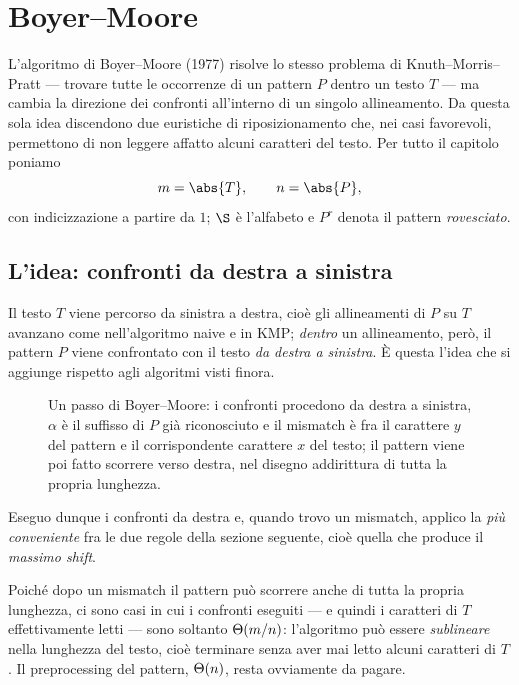 \chapter{Boyer--Moore}

L'algoritmo di Boyer--Moore (1977) risolve lo stesso problema di Knuth--Morris--Pratt
--- trovare tutte le occorrenze di un pattern $P$ dentro un testo $T$ --- ma cambia la
direzione dei confronti all'interno di un singolo allineamento. Da questa sola idea
discendono due euristiche di riposizionamento che, nei casi favorevoli, permettono di
non leggere affatto alcuni caratteri del testo. Per tutto il capitolo poniamo
\[
  m=\abs{T},\qquad n=\abs{P},
\]
con indicizzazione a partire da $1$; $\alfa$ è l'alfabeto e $P^r$ denota il pattern
\emph{rovesciato}.

\section{L'idea: confronti da destra a sinistra}

Il testo $T$ viene percorso da sinistra a destra, cioè gli allineamenti di $P$ su $T$
avanzano come nell'algoritmo naive e in KMP; \emph{dentro} un allineamento, però, il
pattern $P$ viene confrontato con il testo \emph{da destra a sinistra}. È questa
l'idea che si aggiunge rispetto agli algoritmi visti finora.

\begin{figure}[H]
\centering

\caption{Un passo di Boyer--Moore: i confronti procedono da destra a sinistra,
$\alpha$ è il suffisso di $P$ già riconosciuto e il mismatch è fra il carattere
$y$ del pattern e il corrispondente carattere $x$ del testo; il pattern viene poi
fatto scorrere verso destra, nel disegno addirittura di tutta la propria lunghezza.}
\end{figure}

Eseguo dunque i confronti da destra e, quando trovo un mismatch, applico la
\emph{più conveniente} fra le due regole della sezione seguente, cioè quella che
produce il \emph{massimo shift}.

\begin{osservazione}
Poiché dopo un mismatch il pattern può scorrere anche di tutta la propria lunghezza,
ci sono casi in cui i confronti eseguiti --- e quindi i caratteri di $T$
effettivamente letti --- sono soltanto $\Theta(m/n)$: l'algoritmo può essere
\emph{sublineare} nella lunghezza del testo, cioè terminare senza aver mai letto
alcuni caratteri di $T$. Il preprocessing del pattern, $\Theta(n)$, resta ovviamente
da pagare.
\end{osservazione}

